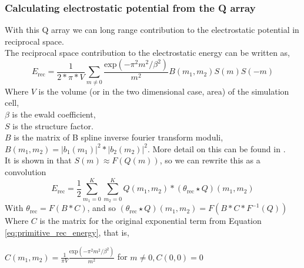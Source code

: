 \documentclass[pdftex,twoside,a4paper]{report}
\newcommand{\bcen}{\begin{center}}
\newcommand{\ecen}{\end{center}}
\begin{document}
\subsubsection{Calculating electrostatic potential from the Q array}
With this Q array we can long range contribution to the electrostatic potential in reciprocal space.\\
The reciprocal space contribution to the electrostatic energy can be written as,\\
\begin{equation}
E_{\text{rec}} = \frac{1}{2*\pi*V} \sum_{m \not= 0} \frac{\text{exp}(- \pi^2 m^2 / \beta^2)}{m^2} B(m_1,m_2) S(m) S(-m)
  \label{eq:primitive_rec_energy} \end{equation}
Where $V$ is the volume (or in the two dimensional case, area) of the simulation cell,\\
$\beta$ is the ewald coefficient,\\
$S$ is the structure factor.\\
$B$ is the matrix of B spline inverse fourier transform moduli, $B(m_1,m_2) = |b_1(m_1)|^2 * |b_2(m_2)|^2$. More detail on this can be found in \cite{essmann:8577}.\\
It is shown in \cite{essmann:8577} that $S(m) \approx F(Q(m))$, so we can rewrite this as a convolution\\
\begin{equation}
E_{\text{rec}} = \frac{1}{2} \sum_{m_1 = 0}^K \sum_{m_2 = 0}^K Q(m_1,m_2) * (\theta_{\text{rec}} \star Q)(m_1,m_2)
\label{eq:energy_rec}
\end{equation}
With $\theta_{\text{rec}} = F(B * C)$, and so $(\theta_{\text{rec}} \star Q)(m_1,m_2) = F(B * C * F^{-1}(Q))$ \cite{essmann:8577} \cite{lee05}\\
Where $C$ is the matrix for the original exponential term from Equation \ref{eq:primitive_rec_energy}, that is,
 \bcen$\displaystyle
C(m_1,m_2) = \frac{1}{\pi V} \frac{\text{exp}(- \pi^2 m^2 / \beta^2)}{m^2} $ for $ m \not= 0, C(0,0) = 0
$\ecen 
\end{document}

